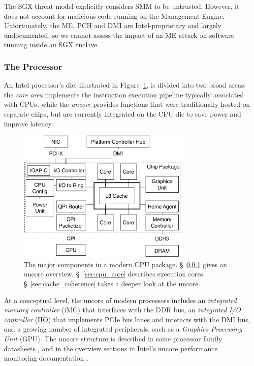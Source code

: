 The SGX threat model explicitly considers SMM to be untrusted. However, it does
not account for malicious code running on the Management Engine. Unfortunately,
the ME, PCH and DMI are Intel-proprietary and largely undocumented, so we
cannot assess the impact of an ME attack on software running inside an SGX
enclave.


\subsubsection{The Processor}
\label{sec:cpu_die}

An Intel processor's die, illustrated in Figure~\ref{fig:cpu_die}, is divided
into two broad areas: the \textit{core area} implements the instruction
execution pipeline typically associated with CPUs, while the \textit{uncore}
provides functions that were traditionally hosted on separate chips, but are
currently integrated on the CPU die to save power and improve latency.

\begin{figure}[hbt]
  \centering
  \includegraphics[width=85mm]{figures/cpu_die.pdf}
  \caption{
    The major components in a modern CPU package. \S~\ref{sec:cpu_die} gives
    an uncore overview. \S~\ref{sec:cpu_core} describes execution cores.
    \S~\ref{sec:cache_coherence} takes a deeper look at the uncore.
  }
  \label{fig:cpu_die}
\end{figure}


At a conceptual level, the uncore of modern processors includes an
\textit{integrated memory controller} (iMC) that interfaces with the DDR bus,
an \textit{integrated I/O controller} (IIO) that implements PCIe bus lanes and
interacts with the DMI bus, and a growing number of integrated peripherals,
such as a \textit{Graphics Processing Unit} (GPU). The uncore structure is
described in some processor family datasheets \cite{intel2014datasheet,
intel2010datasheet}, and in the overview sections in Intel's uncore performance
monitoring documentation \cite{intel2014uncore, intel2012uncore,
intel2010uncore}.

